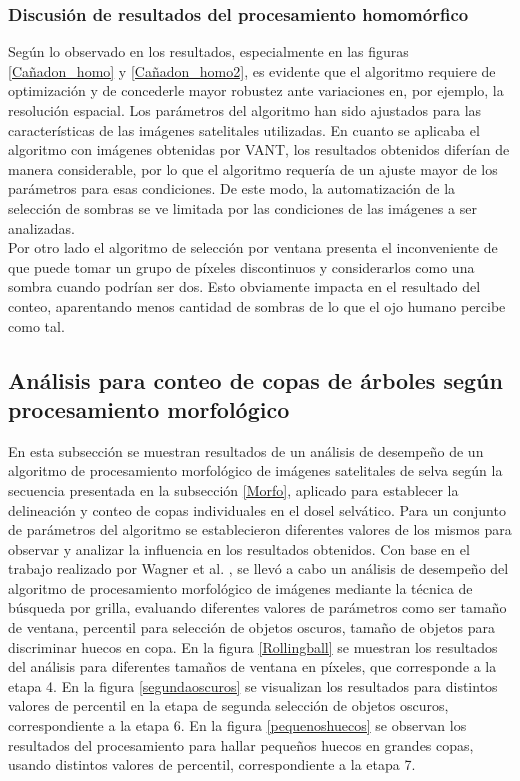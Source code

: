 \subsubsection{Discusión de resultados del procesamiento homomórfico}
Según lo observado en los resultados, especialmente en las figuras \ref{Cañadon_homo} y \ref{Cañadon_homo2}, es evidente que el algoritmo requiere de optimización y de concederle mayor robustez ante variaciones en, por ejemplo, la resolución espacial. Los parámetros del algoritmo han sido ajustados para las características de las imágenes satelitales utilizadas. En cuanto se aplicaba el algoritmo con imágenes obtenidas por VANT, los resultados obtenidos diferían de manera considerable, por lo que el algoritmo requería de un ajuste mayor de los parámetros para esas condiciones. De este modo, la automatización de la selección de sombras se ve limitada por las condiciones de las imágenes a ser analizadas.\\
Por otro lado el algoritmo de selección por ventana presenta el inconveniente de que puede tomar un grupo de píxeles discontinuos y considerarlos como una sombra cuando podrían ser dos. Esto obviamente impacta en el resultado del conteo, aparentando menos cantidad de sombras de lo que el ojo humano percibe como tal.                                                                                                                              

\subsection{Análisis para conteo de copas de árboles según procesamiento morfológico} \label{resultados morfologico}
En esta subsección se muestran resultados de un análisis de desempeño de un algoritmo de procesamiento morfológico de imágenes satelitales de selva según la secuencia presentada en la subsección \ref{Morfo}, aplicado para establecer la delineación y conteo de copas individuales en el dosel selvático. Para un conjunto de parámetros del algoritmo se establecieron diferentes valores de los mismos para observar y analizar la influencia en los resultados obtenidos.
Con base en el trabajo realizado por Wagner et al. \cite{hubert_wagner_individual_2018}, se llevó a cabo un análisis de desempeño del algoritmo de procesamiento morfológico de imágenes mediante la técnica de búsqueda por grilla, evaluando diferentes valores de parámetros como ser tamaño de ventana, percentil para selección de objetos oscuros, tamaño de objetos para discriminar huecos en copa. En la figura \ref{Rollingball} se muestran los resultados del análisis para diferentes tamaños de ventana en  píxeles, que corresponde a la etapa 4. En la figura \ref{segundaoscuros} se visualizan los resultados para distintos valores de percentil en la etapa de segunda selección de objetos oscuros, correspondiente a la etapa 6. En la figura \ref{pequenoshuecos} se observan los resultados del procesamiento para hallar pequeños huecos en grandes copas, usando distintos valores de percentil, correspondiente a la etapa 7. 

